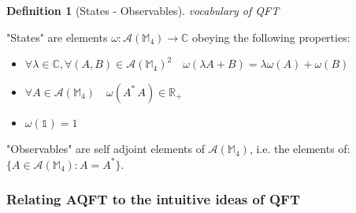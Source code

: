 \documentclass[a4paper,11pt]{article}
\numberwithin{equation}{section}
\theoremstyle{definition}
\newtheorem{definition}{Definition}
\newtheorem{comment}{Comment}
\begin{document}
\begin{definition}[States - Observables] \emph{vocabulary of QFT}

"States" are elements $\omega: \mathcal{A}(\mathbb{M}_4)\to\mathbb{C}$ obeying the following properties:
\begin{itemize}
    \item $\forall \lambda\in\mathbb{C}, \forall(A,B)\in\mathcal{A}(\mathbb{M}_4)^2\quad \omega(\lambda A+B)=\lambda \omega(A)+\omega(B)$
    \item $\forall A \in \mathcal{A}(\mathbb{M}_4)\quad \omega(A^*\, A)\in \mathbb{R}_+$
    \item $\omega(\mathds{1})=1$
\end{itemize}

"Observables" are self adjoint elements of $\mathcal{A}(\mathbb{M}_4)$, i.e. the elements of: $\{A \in\mathcal{A}(\mathbb{M}_4):A=A^*\}$.
\end{definition}

\subsubsection{Relating AQFT to the intuitive ideas of QFT}

\end{document}
